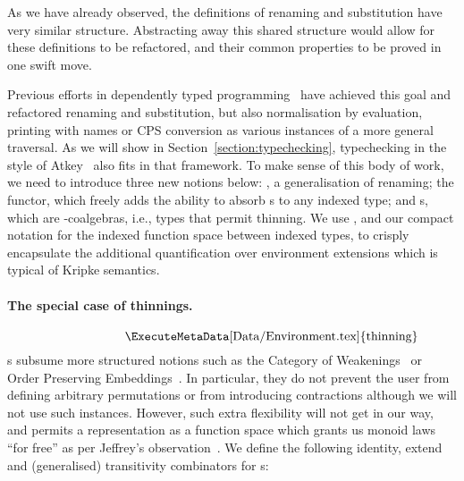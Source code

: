 As we have already observed, the definitions of renaming and substitution have very
similar structure. Abstracting away this shared structure would allow for these
definitions to be refactored, and their common properties to be proved in one swift
move.

Previous efforts in dependently typed
programming~\cite{benton2012strongly,allais2017type}
have achieved this goal and refactored renaming and substitution,
but also normalisation by evaluation, printing with names or CPS conversion
as various instances of a more general traversal. As we will show in Section~\ref{section:typechecking},
typechecking in the style of Atkey~\citeyear{atkey2015algebraic} also
fits in that framework. To make sense of this body of work, we
need to introduce three new notions below: , a generalisation of
renaming; the
 functor, which freely adds the ability to absorb s to any indexed type; and s, which are -coalgebras, i.e., types that permit thinning.
We use , and our compact notation for the indexed function space
between indexed types, to crisply encapsulate the additional quantification
over environment extensions which is typical of Kripke semantics.

\paragraph{The special case of thinnings.} 
\begin{displaymath}
  \begin{minipage}{0.5\linewidth}
    \ExecuteMetaData[Data/Environment.tex]{thinning}
  \end{minipage}
\end{displaymath}
s subsume more structured notions such as the Category of
Weakenings~\cite{altenkirch1995categorical} or Order Preserving
Embeddings~\cite{chapman2009type}. In particular, they do not prevent the
user from defining arbitrary permutations or from introducing contractions
although we will not use such instances. However, such extra flexibility
will not get in our way, and permits a representation as a function space
which grants us monoid laws ``for free'' as per Jeffrey's
observation~\citeyear{jeffrey2011assoc}. We define the following identity, extend and (generalised) transitivity combinators for s:
\begin{center}
\begin{minipage}{0.45\textwidth}
\end{minipage}
\begin{minipage}{0.45\textwidth}
\end{minipage}
\end{center}


